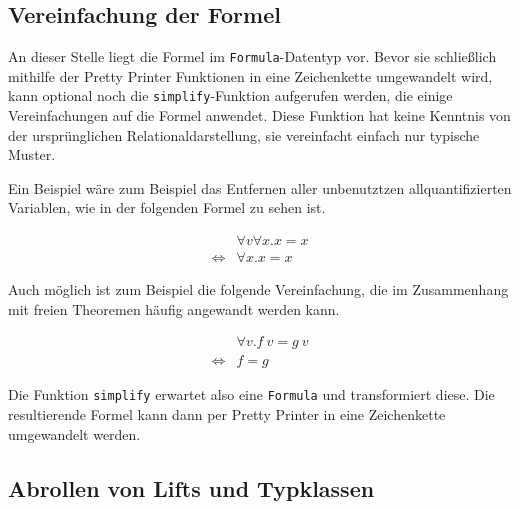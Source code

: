 \subsection{Vereinfachung der Formel}

An dieser Stelle liegt die Formel im \texttt{Formula}-Datentyp vor. Bevor sie schließlich mithilfe der Pretty Printer Funktionen
in eine Zeichenkette umgewandelt wird, kann optional noch die \texttt{simplify}-Funktion aufgerufen werden, die einige
Vereinfachungen auf die Formel anwendet. Diese Funktion hat keine Kenntnis von der ursprünglichen Relationaldarstellung, sie
vereinfacht einfach nur typische Muster.

Ein Beispiel wäre zum Beispiel das Entfernen aller unbenutztzen allquantifizierten Variablen, wie in der folgenden Formel zu sehen
ist.

\begin{align*}
& \forall v \forall x . x = x \\
\Leftrightarrow & \forall x . x = x 
\end{align*}

Auch möglich ist zum Beispiel die folgende Vereinfachung, die im Zusammenhang mit freien Theoremen häufig angewandt werden
kann.

\begin{align*}
&\forall v . f\ v = g\ v\\
\Leftrightarrow & f = g
\end{align*}

Die Funktion \texttt{simplify} erwartet also eine \texttt{Formula} und transformiert diese. Die resultierende Formel kann
dann per Pretty Printer in eine Zeichenkette umgewandelt werden.



\subsection{Abrollen von Lifts und Typklassen}

